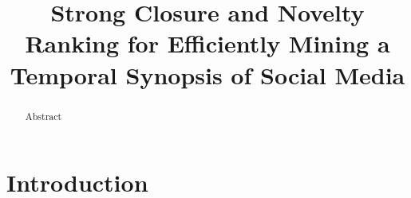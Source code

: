 \documentclass{sig-alternate}
\begin{document}
%

\title{Strong Closure and Novelty Ranking for Efficiently Mining a Temporal Synopsis of Social Media }
%
%
%
%
%
\maketitle
\begin{abstract}
Abstract
\end{abstract}

\section{Introduction}
\end{document}
